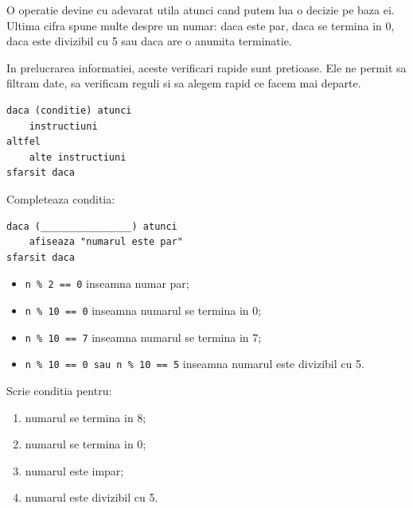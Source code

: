 
\begin{missionbox}
  O operatie devine cu adevarat utila atunci cand putem lua o decizie pe baza ei. Ultima cifra spune multe despre un numar: daca este par, daca se termina in 0, daca este divizibil cu 5 sau daca are o anumita terminatie.

  In prelucrarea informatiei, aceste verificari rapide sunt pretioase. Ele ne permit sa filtram date, sa verificam reguli si sa alegem rapid ce facem mai departe.
\end{missionbox}

\begin{conceptbox}
\begin{lstlisting}[style=codequest]
daca (conditie) atunci
    instructiuni
altfel
    alte instructiuni
sfarsit daca
\end{lstlisting}
\end{conceptbox}

\begin{guidebox}
  Completeaza conditia:
\begin{lstlisting}[style=codequest]
daca (________________) atunci
    afiseaza "numarul este par"
sfarsit daca
\end{lstlisting}
\end{guidebox}

\newpage
{}

\begin{examplebox}
  \begin{itemize}
    \item \texttt{n \% 2 == 0} inseamna numar par;
    \item \texttt{n \% 10 == 0} inseamna numarul se termina in 0;
    \item \texttt{n \% 10 == 7} inseamna numarul se termina in 7;
    \item \texttt{n \% 10 == 0 sau n \% 10 == 5} inseamna numarul este divizibil cu 5.
  \end{itemize}
\end{examplebox}

\begin{guidebox}
  Scrie conditia pentru:
  \begin{enumerate}
    \item numarul se termina in 8;
    \item numarul se termina in 0;
    \item numarul este impar;
    \item numarul este divizibil cu 5.
  \end{enumerate}
\end{guidebox}

